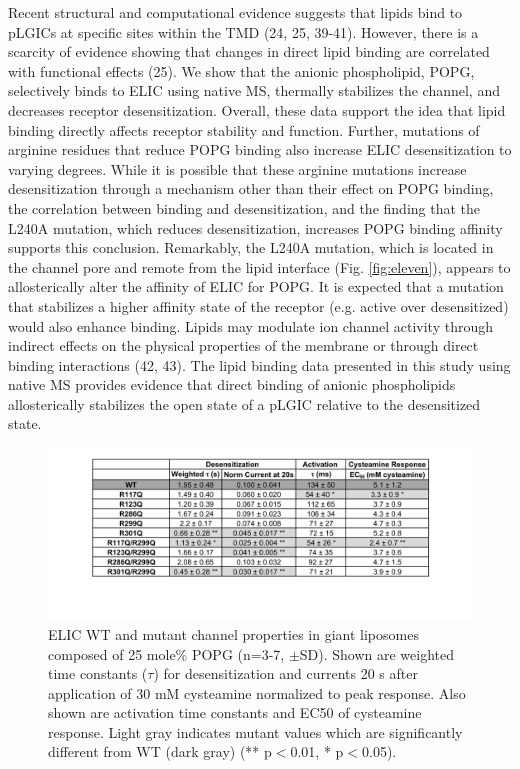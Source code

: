 Recent structural and computational evidence suggests that lipids bind
to pLGICs at specific sites within the TMD (24, 25, 39-41). However,
there is a scarcity of evidence showing that changes in direct lipid
binding are correlated with functional effects (25). We show that the
anionic phospholipid, POPG, selectively binds to ELIC using native MS,
thermally stabilizes the channel, and decreases receptor
desensitization. Overall, these data support the idea that lipid binding
directly affects receptor stability and function. Further, mutations of
arginine residues that reduce POPG binding also increase ELIC
desensitization to varying degrees. While it is possible that these
arginine mutations increase desensitization through a mechanism other
than their effect on POPG binding, the correlation between binding and
desensitization, and the finding that the L240A mutation, which reduces
desensitization, increases POPG binding affinity supports this
conclusion. Remarkably, the L240A mutation, which is located in the
channel pore and remote from the lipid interface (Fig. \ref{fig:eleven}), appears to
allosterically alter the affinity of ELIC for POPG. It is expected that
a mutation that stabilizes a higher affinity state of the receptor (e.g.
active over desensitized) would also enhance binding. Lipids may
modulate ion channel activity through indirect effects on the physical
properties of the membrane or through direct binding interactions (42,
43). The lipid binding data presented in this study using native MS
provides evidence that direct binding of anionic phospholipids
allosterically stabilizes the open state of a pLGIC relative to the
desensitized state.

\begin{figure}

\includegraphics[width=\linewidth]{./pandoc_test/media/image8.pdf}

\caption[ELIC WT and mutant channel properties in giant liposomes composed of 25 mole\% POPG (n=3-7, $\pm$SD).] {ELIC WT and mutant channel properties in giant liposomes composed of 25 mole\% POPG (n=3-7, $\pm$SD). Shown are weighted time constants ($\tau$) for desensitization and currents 20 s after application of 30 mM cysteamine normalized to peak response. Also shown are activation time constants and EC50 of cysteamine response. Light gray indicates mutant values which are significantly different from WT (dark gray) (** p$<$0.01, * p$<$0.05).} 
\label{fig:nine}

\end{figure}

